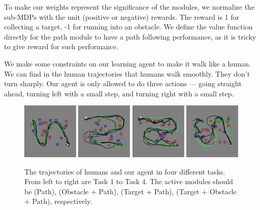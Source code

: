 \documentclass[11pt]{article} %
\begin{document}
To make our weights represent the significance of the modules, we
normalize the sub-MDPs with the unit (positive or negative) rewards. The reward
is 1 for collecting a target, -1 for running into an obstacle. We define the
value function directly for the path module to have a path following
performance, as it is tricky to give reward for such performance.

We make some constraints on our learning agent to make it walk like a human.
We can find in the human trajectories that humans walk smoothly. They don't turn
sharply.  Our agent is only allowed to do three actions --- going straight ahead,
turning left with a small step, and turning right with a small step.

\begin{figure}[h!]
\centering
\includegraphics[width=0.24\textwidth]{task_1.png}
\includegraphics[width=0.24\textwidth]{task_2.png}
\includegraphics[width=0.24\textwidth]{task_3.png}
\includegraphics[width=0.24\textwidth]{task_4.png}
\caption{The trajectories of humans and our agent in four different tasks. From
left to right are Task 1 to Task 4. The active modules should be (Path),
(Obstacle + Path), (Target + Path), (Target + Obstacle + Path), respectively.}
\label{fig:exp}
\end{figure}
\end{document}
